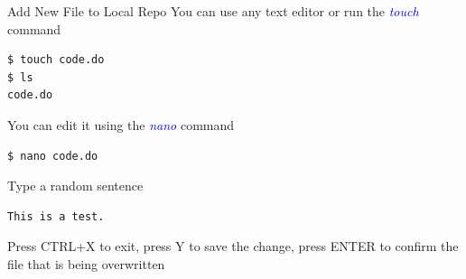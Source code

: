 \documentclass[11pt]{beamer}
\begin{document}
\begin{frame}[fragile]{Add New File to Local Repo}
You can use any text editor or run the \textcolor{blue}{\emph{touch}} command
\begin{lstlisting}
$ touch code.do
$ ls
code.do
\end{lstlisting}
You can edit it using the \textcolor{blue}{\emph{nano}} command
\begin{lstlisting}
$ nano code.do
\end{lstlisting}
Type a random sentence
\begin{lstlisting}
This is a test.
\end{lstlisting}
Press CTRL+X to exit, press Y to save the change, press ENTER to confirm the file that is being overwritten
\end{frame}
\end{document}

